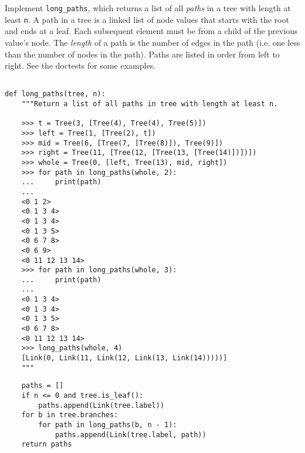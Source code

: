 \question Implement \texttt{long\_paths}, which returns a list of all \emph{paths} in a tree with
length at least \texttt{n}. A path in a tree is a linked list of node values that
starts with the root and ends at a leaf. Each subsequent element must be from a
child of the previous value's node. The \emph{length} of a path is the number of
edges in the path (i.e. one less than the number of nodes in the path).
Paths are listed in order from left to right. See the doctests for some
examples.


\begin{lstlisting}

def long_paths(tree, n):
    """Return a list of all paths in tree with length at least n.

    >>> t = Tree(3, [Tree(4), Tree(4), Tree(5)])
    >>> left = Tree(1, [Tree(2), t])
    >>> mid = Tree(6, [Tree(7, [Tree(8)]), Tree(9)])
    >>> right = Tree(11, [Tree(12, [Tree(13, [Tree(14)])])])
    >>> whole = Tree(0, [left, Tree(13), mid, right])
    >>> for path in long_paths(whole, 2):
    ...     print(path)
    ...
    <0 1 2>
    <0 1 3 4>
    <0 1 3 4>
    <0 1 3 5>
    <0 6 7 8>
    <0 6 9>
    <0 11 12 13 14>
    >>> for path in long_paths(whole, 3):
    ...     print(path)
    ...
    <0 1 3 4>
    <0 1 3 4>
    <0 1 3 5>
    <0 6 7 8>
    <0 11 12 13 14>
    >>> long_paths(whole, 4)
    [Link(0, Link(11, Link(12, Link(13, Link(14)))))]
    """
\end{lstlisting}
\begin{solution}
\begin{lstlisting}
    paths = []
    if n <= 0 and tree.is_leaf():
        paths.append(Link(tree.label))
    for b in tree.branches:
        for path in long_paths(b, n - 1):
            paths.append(Link(tree.label, path))
    return paths
\end{lstlisting}
\end{solution}
